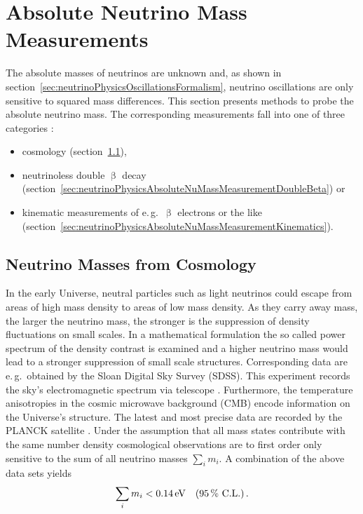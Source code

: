\section{Absolute Neutrino Mass Measurements}
\label{sec:neutrinoPhysicsAbsoluteNuMassMeasurement}
The absolute masses of neutrinos are unknown and, as shown in section~\ref{sec:neutrinoPhysicsOscillationsFormalism}, neutrino oscillations are only sensitive to squared mass differences. This section presents methods to probe the absolute neutrino mass. The corresponding measurements fall into one of three categories \cite{Otten:2008zz}:
\begin{itemize}
    \renewcommand{\labelitemi}{$\bullet$}
    \item cosmology (section~\ref{sec:neutrinoPhysicsAbsoluteNuMassMeasurementCosmo}),
    \item neutrinoless double $\upbeta$ decay (section~\ref{sec:neutrinoPhysicsAbsoluteNuMassMeasurementDoubleBeta}) or
    \item kinematic measurements of e.\,g.~$\upbeta$ electrons or the like (section~\ref{sec:neutrinoPhysicsAbsoluteNuMassMeasurementKinematics}).
\end{itemize}

\subsection{Neutrino Masses from Cosmology}
\label{sec:neutrinoPhysicsAbsoluteNuMassMeasurementCosmo}
In the early Universe, neutral particles such as light neutrinos could escape from areas of high mass density to areas of low mass density. As they carry away mass, the larger the neutrino mass, the stronger is the suppression of density fluctuations on small scales. In a mathematical formulation the so called power spectrum of the density contrast is examined and a higher neutrino mass would lead to a stronger suppression of small scale structures. Corresponding data are e.\,g.~obtained by the Sloan Digital Sky Survey (SDSS). This experiment records the sky's electromagnetic spectrum via telescope \cite{Doroshkevich2004}. Furthermore, the temperature anisotropies in the cosmic microwave background (CMB) encode information on the Universe's structure. The latest and most precise data are recorded by the PLANCK satellite \cite{Aghanim:2018}. Under the assumption that all mass states contribute with the same number density cosmological observations are to first order only sensitive to the sum of all neutrino masses $\sum_{i} m_i$. A combination of the above data sets yields \cite{Yeche:2017upn}
\begin{equation*}
    \sum_i m_i < \SI{0.14}{eV} \quad (\SI{95}{\percent} \text{ C.L.}) \text{\,.}
\end{equation*}
\FloatBarrier

